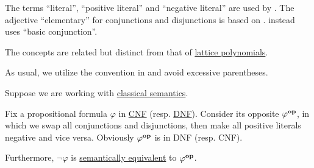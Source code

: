 \begin{comments}
  \item The terms \enquote{literal}, \enquote{positive literal} and \enquote{negative literal} are used by . The adjective \enquote{elementary} for conjunctions and disjunctions is based on \cite[36]{Эдельман1975}.  instead uses \enquote{basic conjunction}.
  \item The concepts are related but distinct from that of \hyperref[rem:lattice_polynomials]{lattice polynomials}.
  \item As usual, we utilize the convention in  and avoid excessive parentheses.
\end{comments}

\begin{theorem}\label{thm:cnf_and_dnf_duality}
  Suppose we are working with \hyperref[def:propositional_semantics]{classical semantics}.

  Fix a propositional formula \( \varphi \) in \hyperref[def:cnf_and_dnf]{CNF} (resp. \hyperref[def:cnf_and_dnf]{DNF}). Consider its opposite \( \varphi^\oppos \), in which we swap all conjunctions and disjunctions, then make all positive literals negative and vice versa. Obviously \( \varphi^\oppos \) is in DNF (resp. CNF).

  Furthermore, \( \neg \varphi \) is \hyperref[def:semantic_equivalence]{semantically equivalent} to \( \varphi^\oppos \).
\end{theorem}

